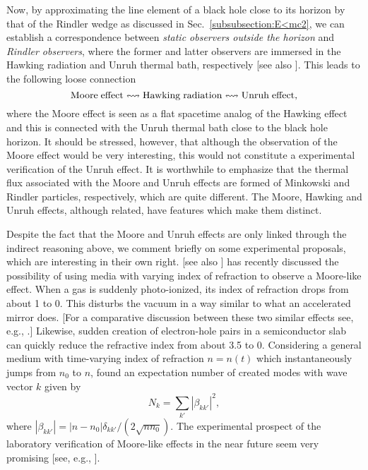 \documentclass[12pt,nofootinbib,floatfix,aps,prd,showpacs,amsmath,amssymb,eqsecnum]{revtex4-2}
\let\cite\citep
\begin{document}
Now, by approximating the line element of a black hole 
close to its horizon by that of the Rindler wedge as discussed 
in Sec.~\ref{subsubsection:E<mc2}, we can establish a correspondence
between {\em static observers outside the horizon} and {\em Rindler 
observers}, where the former and latter observers
are immersed in the Hawking 
radiation and Unruh thermal bath, respectively 
[see also \textcite{Ginzburgetal87}]. 
This leads to the following loose connection
$$
{\rm Moore} \; {\rm effect} \leftrightsquigarrow 
{\rm Hawking} \; {\rm radiation} \leftrightsquigarrow
{\rm Unruh} \; {\rm effect},
$$
where the Moore effect is seen as a flat spacetime analog of 
the Hawking effect and this is connected with the Unruh thermal
bath close to the black hole horizon. It should be stressed, however, 
that although the observation  of the Moore effect would
be very interesting, this would not constitute a experimental
verification of the Unruh effect. It is worthwhile to emphasize 
that the thermal flux associated with the Moore and Unruh effects are 
formed of Minkowski and Rindler particles, respectively, which are 
quite different. The Moore, Hawking and Unruh effects, although 
related, have features which make them distinct.

Despite the fact that the Moore and Unruh effects are only linked 
through the indirect reasoning above, we comment briefly on 
some experimental proposals, which are interesting in their own right.
\textcite{Yablonovitch89} [see also \textcite{Yablonovitchetal89}] has 
recently discussed the possibility of using media with varying index of 
refraction to observe a Moore-like effect. When a gas is suddenly 
photo-ionized, its index of refraction drops from about 1 to 0. 
This disturbs the vacuum in a way similar to what 
an accelerated mirror does.
[For a comparative discussion between these two similar effects see, e.g., 
\textcite{Johnstonetal95}.]  Likewise, sudden creation of electron-hole 
pairs in a semiconductor slab can quickly reduce the refractive index 
from about 3.5 to 0. 
Considering a general medium with time-varying index of refraction 
$n=n(t)$ which instantaneously jumps from  $n_0$ to $n$,
\textcite{Yablonovitch89}
found an expectation number of created modes with wave vector $k$ given by
$$
N_k =  \sum_{k'} |\beta_{k {k'}}|^2,
$$
where
$
 |\beta_{k {k'}}| = |n-n_0| \delta_{k {k'}}/(2 \sqrt{n n_0})
$.
The experimental prospect of the laboratory verification of 
Moore-like effects in the near future seem very promising [see, 
e.g., \cite{Kimetal06,Uhlmannetal04}].
\end{document}
